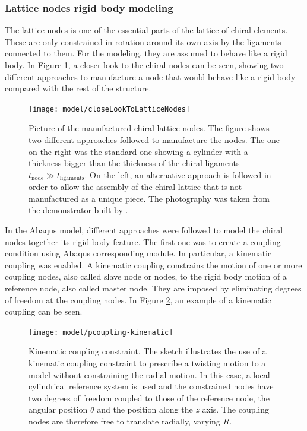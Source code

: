     \clearpage
    \subsubsection{Lattice nodes rigid body modeling} \label{subsubsec:latticeNodesRigid_Parametrization}

    The lattice nodes is one of the essential parts of the lattice of chiral elements. These are only constrained in rotation around its own axis by the ligaments connected to them. For the modeling, they are assumed to behave like a rigid body. In Figure \ref{fig:closeLookToLatticeNodes}, a closer look to the chiral nodes can be seen, showing two different approaches to manufacture a node that would behave like a rigid body compared with the rest of the structure.

    \begin{figure}[!htpb]
      \centering
      \texttt{[image: model/closeLookToLatticeNodes]}
      \caption[Picture of the manufactured chiral lattice nodes]{Picture of the manufactured chiral lattice nodes. The figure shows two different approaches followed to manufacture the nodes. The one on the right was the standard one showing a cylinder with a thickness bigger than the thickness of the chiral ligaments $t_{\mathrm{node}} \gg t_{\mathrm{ligaments}}$. On the left, an alternative approach is followed in order to allow the assembly of the chiral lattice that is not manufactured as a unique piece. The photography was taken from the demonstrator built by \cite{Vincenz2017}.}\label{fig:closeLookToLatticeNodes}
    \end{figure}

    In the Abaqus model, different approaches were followed to model the chiral nodes together its rigid body feature. The first one was to create a coupling condition using Abaqus corresponding module. In particular, a kinematic coupling was enabled. A kinematic coupling constrains the motion of one or more coupling nodes, also called slave node or nodes, to the rigid body motion of a reference node, also called master node. They are imposed by eliminating degrees of freedom at the coupling nodes. In Figure \ref{fig:kinematicCoupling}, an example of a kinematic coupling can be seen.

    \begin{figure}[!htpb]
      \centering
      \texttt{[image: model/pcoupling-kinematic]}
      \caption[Kinematic coupling constraint]{Kinematic coupling constraint. The sketch illustrates the use of a kinematic coupling constraint to prescribe a twisting motion to a model without constraining the radial motion. In this case, a local cylindrical reference system is used and the constrained nodes have two degrees of freedom coupled to those of the reference node, the angular position $\theta$ and the position along the $z$ axis. The coupling nodes are therefore free to translate radially, varying $R$. \cite{Abaqus}}\label{fig:kinematicCoupling}
    \end{figure}

